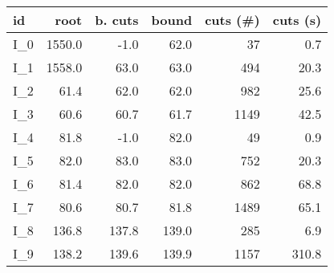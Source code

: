 \begin{tabular}{lrrrrr}
\toprule
   id &   root &  b. cuts &  bound &  cuts (\#) &  cuts (s) \\
\midrule
 I\_0 & 1550.0 &     -1.0 &   62.0 &         37 &       0.7 \\
 I\_1 & 1558.0 &     63.0 &   63.0 &        494 &      20.3 \\
 I\_2 &   61.4 &     62.0 &   62.0 &        982 &      25.6 \\
 I\_3 &   60.6 &     60.7 &   61.7 &       1149 &      42.5 \\
 I\_4 &   81.8 &     -1.0 &   82.0 &         49 &       0.9 \\
 I\_5 &   82.0 &     83.0 &   83.0 &        752 &      20.3 \\
 I\_6 &   81.4 &     82.0 &   82.0 &        862 &      68.8 \\
 I\_7 &   80.6 &     80.7 &   81.8 &       1489 &      65.1 \\
 I\_8 &  136.8 &    137.8 &  139.0 &        285 &       6.9 \\
 I\_9 &  138.2 &    139.6 &  139.9 &       1157 &     310.8 \\
\bottomrule
\end{tabular}
